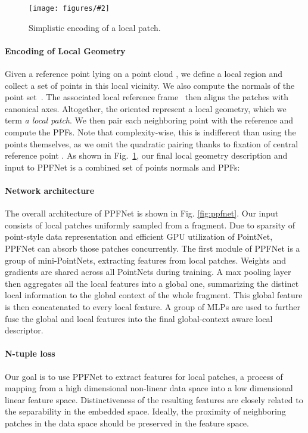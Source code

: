 \documentclass[10pt,twocolumn,letterpaper]{article}
\theoremstyle{break}
\newcommand{\insertimageC}[5]{ \begin{figure}[#5]
\centering
\texttt{[image: figures/\#2]}
\caption{#3}
\label{#4}
\vspace{-2mm}
\end{figure}
}
\begin{document}
\insertimageC{1}{ppfdrawing_cropped.pdf}{Simplistic encoding of a local patch.}{fig:ppf}{t!}
\vspace{-3mm}
\paragraph{Encoding of Local Geometry}
Given a reference point lying on a point cloud , we define a local region  and collect a set of points  in this local vicinity. We also compute the normals of the point set~\cite{Hoppe1992}. The associated local reference frame~\cite{tombari2010unique} then aligns the patches with canonical axes. Altogether, the oriented  represent a local geometry, which we term \textit{a local patch}. We then pair each neighboring point  with the reference  and compute the PPFs. Note that complexity-wise, this is indifferent than using the points themselves, as we omit the quadratic pairing thanks to fixation of central reference point . As shown in Fig.~\ref{fig:ppf}, our final local geometry description and input to PPFNet is a combined set of points normals and PPFs:

\vspace{-10mm}
\paragraph{Network architecture}
The overall architecture of PPFNet is shown in Fig. \ref{fig:ppfnet}.  Our input consists of  local patches uniformly sampled from a fragment. Due to sparsity of point-style data representation and efficient GPU utilization of PointNet, PPFNet can absorb those  patches concurrently. The first module of PPFNet is a group of mini-PointNets, extracting features from local patches. Weights and gradients are shared across all PointNets during training. A max pooling layer then aggregates all the local features into a global one, summarizing the distinct local information to the global context of the whole fragment. This global feature is then concatenated to every local feature. A group of MLPs are used to further fuse the global and local features into the final global-context aware local descriptor.
\vspace{-3mm}
\paragraph{N-tuple loss}
Our goal is to use PPFNet to extract features for local patches, a process of mapping from a high dimensional non-linear data space into a low dimensional linear feature space. Distinctiveness of the resulting features are closely related to the separability in the embedded space. Ideally, the proximity of neighboring patches in the data space should be preserved in the feature space.
\end{document}
